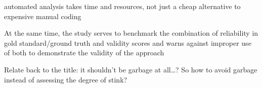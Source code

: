 \documentclass[man, 12pt, a4paper, nolmodern, noextraspace]{apa6}
\begin{document}
	automated analysis takes time and resources, not just a cheap alternative to expensive manual coding 
	
    At the same time, the study serves to benchmark the combination of reliability in gold standard/ground truth and validity scores and warns against improper use of both to demonstrate the validity of the approach
    
	Relate back to the title: it shouldn’t be garbage at all…? So how to avoid garbage instead of assessing the degree of stink? 


    
\printbibliography
\end{document}
